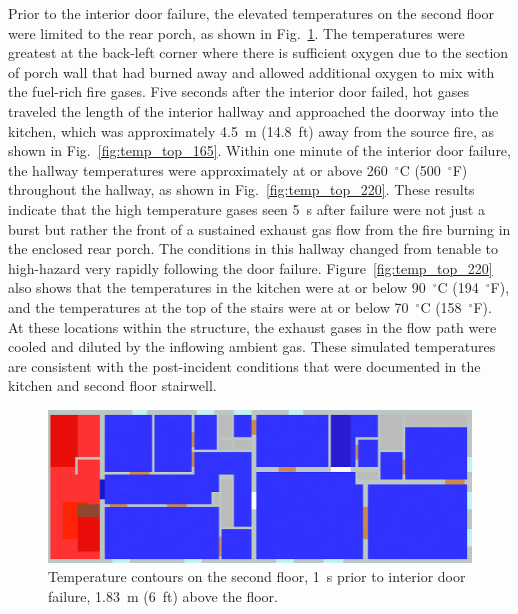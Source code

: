 \documentclass[12pt,oneside]{book}
\begin{document}
Prior to the interior door failure, the elevated temperatures on the second floor were limited to the rear porch, as shown in Fig.~\ref{fig:temp_top_159}. The temperatures were greatest at the back-left corner where there is sufficient oxygen due to the section of porch wall that had burned away and allowed additional oxygen to mix with the fuel-rich fire gases. Five seconds after the interior door failed, hot gases traveled the length of the interior hallway and approached the doorway into the kitchen, which was approximately 4.5~m (14.8~ft) away from the source fire, as shown in Fig.~\ref{fig:temp_top_165}. Within one minute of the interior door failure, the hallway temperatures were approximately at or above 260~$^{\circ}$C (500~$^{\circ}$F) throughout the hallway, as shown in Fig.~\ref{fig:temp_top_220}. These results indicate that the high temperature gases seen 5~s after failure were not just a burst but rather the front of a sustained exhaust gas flow from the fire burning in the enclosed rear porch. The conditions in this hallway changed from tenable to high-hazard very rapidly following the door failure. Figure~\ref{fig:temp_top_220} also shows that the temperatures in the kitchen were at or below 90~$^{\circ}$C (194~$^{\circ}$F), and the temperatures at the top of the stairs were at or below 70~$^{\circ}$C (158~$^{\circ}$F). At these locations within the structure, the exhaust gases in the flow path were cooled and diluted by the inflowing ambient gas. These simulated temperatures are consistent with the post-incident conditions that were documented in the kitchen and second floor stairwell.
\begin{figure}[!ht]
\centering
\includegraphics[width=.68\textwidth]{../Figures/west_50th_baseline_top_159_6ft}
 

\caption[Temperature contours on the second floor, 1~s prior to interior door failure.]
{Temperature contours on the second floor, 1~s prior to interior door failure, 1.83~m (6~ft) above the floor.}
\label{fig:temp_top_159}
\end{figure}
\end{document}
